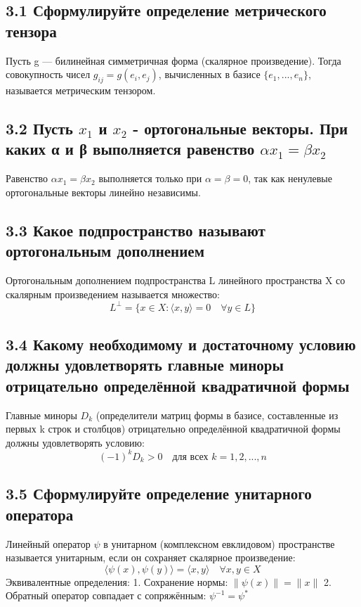\documentclass{article}
\begin{document}
\subsection*{3.1 Сформулируйте определение метрического тензора}
Пусть g — билинейная симметричная форма (скалярное произведение). Тогда совокупность чисел \(g_{ij} = g(e_i, e_j)\), вычисленных в базисе \(\{e_1, ..., e_n\}\), называется метрическим тензором.

\subsection*{3.2 Пусть \(x_1\) и \(x_2\) - ортогональные векторы. При каких α и β выполняется равенство \(αx_1 = βx_2\)}
Равенство \(αx_1 = βx_2\) выполняется только при \(α = β = 0\), так как ненулевые ортогональные векторы линейно независимы.

\subsection*{3.3 Какое подпространство называют ортогональным дополнением}
Ортогональным дополнением подпространства L линейного пространства X со скалярным произведением называется множество:
\[L^\perp = \{x \in X : \langle x, y \rangle = 0 \quad \forall y \in L\}\]

\subsection*{3.4 Какому необходимому и достаточному условию должны удовлетворять главные миноры отрицательно определённой квадратичной формы}
Главные миноры \(D_k\) (определители матриц формы в базисе, составленные из первых k строк и столбцов) отрицательно определённой квадратичной формы должны удовлетворять условию:
\[(-1)^k D_k > 0 \quad \text{для всех } k = 1, 2, ..., n\]

\subsection*{3.5 Сформулируйте определение унитарного оператора}
Линейный оператор \( \psi \) в унитарном (комплексном евклидовом) пространстве называется унитарным, если он сохраняет скалярное произведение:
\[\langle \psi(x), \psi(y) \rangle = \langle x, y \rangle \quad \forall x, y \in X\]
Эквивалентные определения:
1. Сохранение нормы: \(\| \psi(x) \| = \| x \|\)
2. Обратный оператор совпадает с сопряжённым: \( \psi^{-1} = \psi^* \)

\newpage
\end{document}
